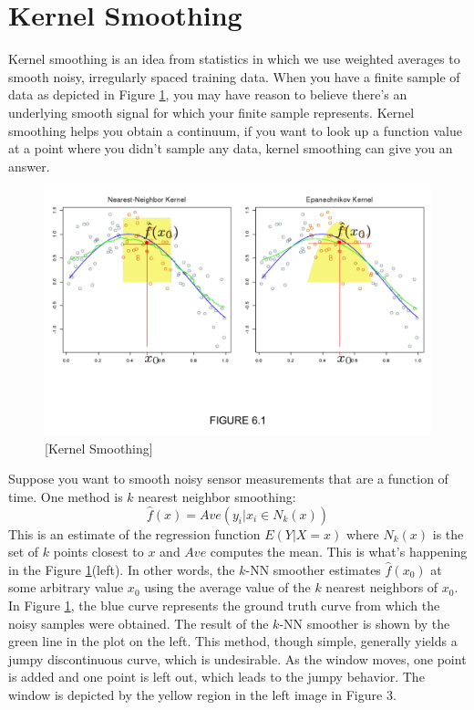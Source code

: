 \documentclass[a4paper]{article}
\begin{document}
\section{Kernel Smoothing}
Kernel smoothing is an idea from statistics in which we use weighted averages to smooth noisy, irregularly spaced training data.  When you have a finite sample of data as depicted in Figure \ref{fig:fig6_1}, you may have reason to believe there's an underlying smooth signal for which your finite sample represents. Kernel smoothing helps you obtain a continuum,  if you want to look up a function value at a point where you didn't sample any data, kernel smoothing can give you an answer.

\begin{figure}
\centering
\includegraphics[width=1.0\textwidth]{fig6_1.png}
\caption{\label{fig:fig6_1}[Kernel Smoothing]}
\end{figure}



Suppose you want to smooth noisy sensor measurements that are a function of time.  One method is $k$ nearest neighbor smoothing:
$$\widehat{f}(x) = Ave\left(y_i | x_i \in N_k(x)\right)$$
This is an estimate of the regression function $E(Y|X=x)$ where $N_k(x)$ is the set of $k$ points closest to $x$ and $Ave$ computes the mean.  This is what's happening in the Figure \ref{fig:fig6_1}(left).  In other words, the $k$-NN smoother estimates $\widehat{f}(x_0)$ at some arbitrary value $x_0$ using the average value of the $k$ nearest neighbors of $x_0$. In Figure \ref{fig:fig6_1}, the blue curve represents the ground truth curve from which the noisy samples were obtained.  The result of the $k$-NN smoother is shown by the green line in the plot on the left.  This method, though simple, generally yields a jumpy discontinuous curve, which is undesirable.  As the window moves, one point is added and one point is left out, which leads to the jumpy behavior. The window is depicted by the yellow region in the left image in Figure 3.
\end{document}
